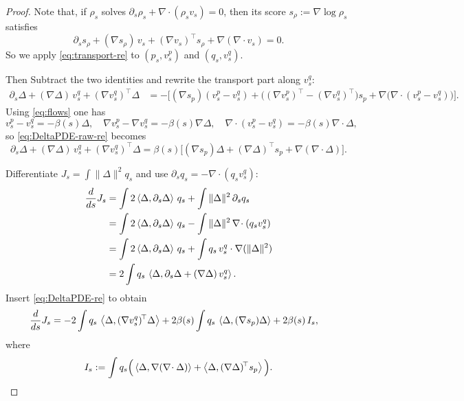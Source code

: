\documentclass[12pt]{article}
\theoremstyle{definition} %
\begin{document}
\begin{proof}
Note that,
if $\rho_s$ solves $\partial_s\rho_s+\nabla\!\cdot(\rho_s v_s)=0$, then its score
$s_\rho:=\nabla\log\rho_s$ satisfies
\begin{equation}\label{eq:transport-re}
\partial_s s_\rho + (\nabla s_\rho)\,v_s + (\nabla v_s)^{\!\top} s_\rho + \nabla(\nabla\!\cdot v_s)=0.
\end{equation}
So we apply \eqref{eq:transport-re} to $(p_s,v_s^p)$ and $(q_s,v_s^q)$.

Then Subtract the two identities and rewrite the transport part along $v_s^q$:
\begin{align}
\partial_s \Delta + (\nabla\Delta)\,v_s^q + (\nabla v_s^q)^{\!\top}\Delta
&= -\Big[(\nabla s_p)(v_s^p-v_s^q) + \big((\nabla v_s^p)^{\!\top}-(\nabla v_s^q)^{\!\top}\big)s_p
+ \nabla\big(\nabla\!\cdot(v_s^p-v_s^q)\big)\Big].
\label{eq:DeltaPDE-raw-re}
\end{align}
Using \eqref{eq:flows} one has
\[
v_s^p-v_s^q=-\beta(s)\Delta,\quad
\nabla v_s^p-\nabla v_s^q=-\beta(s)\nabla\Delta,\quad
\nabla\!\cdot(v_s^p-v_s^q)=-\beta(s)\nabla\!\cdot\Delta,
\]
so \eqref{eq:DeltaPDE-raw-re} becomes
\begin{equation}\label{eq:DeltaPDE-re}
\partial_s \Delta + (\nabla\Delta)\,v_s^q + (\nabla v_s^q)^{\!\top}\Delta
=\beta(s)\Big[(\nabla s_p)\Delta + (\nabla\Delta)^{\!\top} s_p + \nabla(\nabla\!\cdot\Delta)\Big].
\end{equation}

Differentiate $J_s=\int \|\Delta\|^2 q_s$ and use $\partial_s q_s=-\nabla\!\cdot(q_s v_s^q)$:
\begin{align*}
\frac{d}{ds}J_s
&=\int 2\left\langle \Delta,\partial_s\Delta \right\rangle\,q_s
+\int \|\Delta\|^2\,\partial_s q_s\\
&=\int 2\left\langle \Delta,\partial_s\Delta \right\rangle\,q_s
-\int \|\Delta\|^2\,\nabla\!\cdot(q_s v_s^q)\\
&=\int 2\left\langle \Delta,\partial_s\Delta \right\rangle\,q_s
+\int q_s\,v_s^q\cdot\nabla(\|\Delta\|^2)\\
&=2\int q_s\,\left\langle \Delta,\partial_s\Delta+(\nabla\Delta)\,v_s^q \right\rangle.
\end{align*}
Insert \eqref{eq:DeltaPDE-re} to obtain
\begin{align}
\frac{d}{ds}J_s
&=-2\int q_s\,\left\langle \Delta,(\nabla v_s^q)^{\!\top}\Delta \right\rangle
+2\beta(s)\int q_s\,\left\langle \Delta,(\nabla s_p)\Delta \right\rangle
+2\beta(s)\,I_s,
\label{eq:Jprime-split}
\end{align}
where
\[
I_s:=\int q_s\Big(\left\langle \Delta,\nabla(\nabla\!\cdot\Delta) \right\rangle+\left\langle \Delta,(\nabla\Delta)^{\!\top}s_p \right\rangle\Big).
\]


\end{proof}
\end{document}
